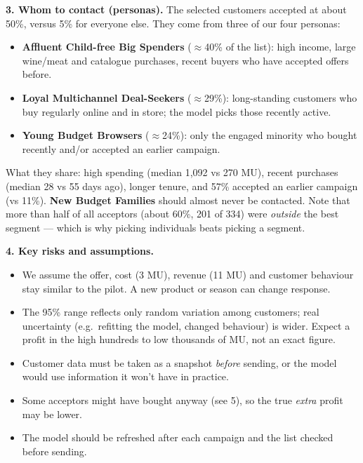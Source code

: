 \documentclass[11pt]{article}
\begin{document}
\textbf{3. Whom to contact (personas).} The selected customers accepted at about 50\%, versus 5\% for everyone else. They come from three of our four personas:
\begin{itemize}
\item \textbf{Affluent Child-free Big Spenders} ($\approx$40\% of the list): high income, large wine/meat and catalogue purchases, recent buyers who have accepted offers before.
\item \textbf{Loyal Multichannel Deal-Seekers} ($\approx$29\%): long-standing customers who buy regularly online and in store; the model picks those recently active.
\item \textbf{Young Budget Browsers} ($\approx$24\%): only the engaged minority who bought recently and/or accepted an earlier campaign.
\end{itemize}
What they share: high spending (median 1,092 vs 270 MU), recent purchases (median 28 vs 55 days ago), longer tenure, and 57\% accepted an earlier campaign (vs 11\%). \textbf{New Budget Families} should almost never be contacted. Note that more than half of all acceptors (about 60\%, 201 of 334) were \emph{outside} the best segment --- which is why picking individuals beats picking a segment.

\textbf{4. Key risks and assumptions.}
\begin{itemize}
\item We assume the offer, cost (3 MU), revenue (11 MU) and customer behaviour stay similar to the pilot. A new product or season can change response.
\item The 95\% range reflects only random variation among customers; real uncertainty (e.g.\ refitting the model, changed behaviour) is wider. Expect a profit in the high hundreds to low thousands of MU, not an exact figure.
\item Customer data must be taken as a snapshot \emph{before} sending, or the model would use information it won't have in practice.
\item Some acceptors might have bought anyway (see 5), so the true \emph{extra} profit may be lower.
\item The model should be refreshed after each campaign and the list checked before sending.
\end{itemize}
\end{document}
